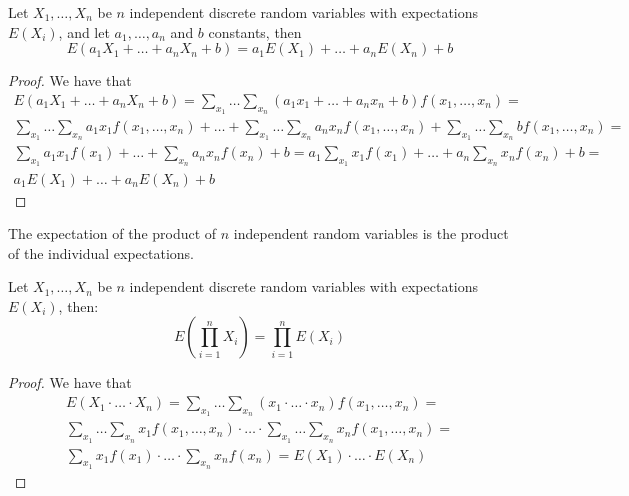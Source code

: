 \begin{proposition}
Let $X_{1}, \ldots, X_{n}$ be $n$ independent discrete random variables with expectations $E\left(X_{i}\right)$, and let $a_1, \ldots, a_n$ and $b$ constants, then
\[
E\left(a_{1}X_{1}+\ldots+a_{n}X_{n}+b\right)=a_{1}E\left(X_{1}\right)+\ldots+a_{n}E\left(X_{n}\right)+b
\]
\end{proposition}
\begin{proof}
We have that
\begin{multline}
E \left(a_1 X_1 + \ldots + a_n X_n +b \right) = 
\sum_{x_1} \ldots \sum_{x_n} \left(a_ 1 x_1 + \ldots + a_n x_n + b  \right) f\left(x_1, \ldots, x_n \right) = \\
\sum_{x_1} \ldots \sum_{x_n} a_1 x_1 f\left(x_1, \ldots, x_n \right) + \ldots + \sum_{x_1} \ldots \sum_{x_n} a_n x_n f\left(x_1, \ldots, x_n \right) + \sum_{x_1} \ldots \sum_{x_n} b f\left(x_1, \ldots, x_n \right) = \\
\sum_{x_1} a_1 x_1 f\left(x_1\right) + \ldots + \sum_{x_n} a_n x_n f\left( x_n \right) + b = 
a_1 \sum_{x_1} x_1 f\left(x_1\right) + \ldots + a_n \sum_{x_n} x_n f\left( x_n \right) + b = \\
a_1 E\left(X_1\right) + \ldots + a_n E\left(X_n\right) + b
\end{multline}
\end{proof}

The expectation of the product of $n$ independent random variables is the product of the individual expectations.

\begin{proposition}
Let $X_{1}, \ldots, X_{n}$ be $n$ independent discrete random variables with expectations $E\left(X_{i}\right)$, then:
\[
E\left(\prod_{i=1}^{n}X_{i}\right)=\prod_{i=1}^{n}E\left(X_{i}\right)
\]
\end{proposition}
\begin{proof}
We have that
\begin{multline}
E \left(X_1  \cdot \ldots \cdot X_n  \right) = 
\sum_{x_1} \ldots \sum_{x_n} \left(x_1 \cdot \ldots \cdot x_n  \right) f\left(x_1, \ldots, x_n \right) = \\
\sum_{x_1} \ldots \sum_{x_n} x_1 f\left(x_1, \ldots, x_n \right) \cdot \ldots \cdot \sum_{x_1} \ldots \sum_{x_n} x_n f\left(x_1, \ldots, x_n \right) = \\
\sum_{x_1} x_1 f\left(x_1\right) \cdot \ldots \cdot \sum_{x_n} x_n f\left( x_n \right) = 
E \left( X_1 \right) \cdot \ldots \cdot E \left( X_n \right)
\end{multline}
\end{proof}


